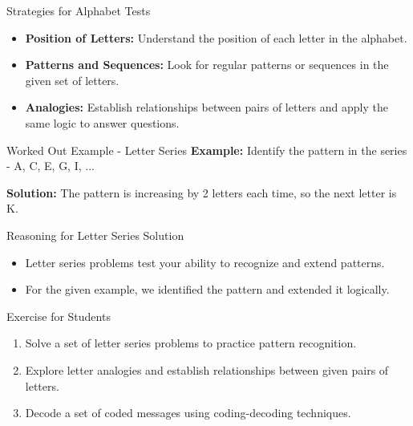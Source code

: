 \begin{frame}{Strategies for Alphabet Tests}
  \begin{itemize}
    \item \textbf{Position of Letters:} Understand the position of each letter in the alphabet.
    \item \textbf{Patterns and Sequences:} Look for regular patterns or sequences in the given set of letters.
    \item \textbf{Analogies:} Establish relationships between pairs of letters and apply the same logic to answer questions.
  \end{itemize}
\end{frame}

\begin{frame}{Worked Out Example - Letter Series}
  \textbf{Example:} Identify the pattern in the series - A, C, E, G, I, ...

  \textbf{Solution:} The pattern is increasing by 2 letters each time, so the next letter is K.
\end{frame}

\begin{frame}{Reasoning for Letter Series Solution}
  \begin{itemize}
    \item Letter series problems test your ability to recognize and extend patterns.
    \item For the given example, we identified the pattern and extended it logically.
  \end{itemize}
\end{frame}

\begin{frame}{Exercise for Students}
  \begin{enumerate}
    \item Solve a set of letter series problems to practice pattern recognition.
    \item Explore letter analogies and establish relationships between given pairs of letters.
    \item Decode a set of coded messages using coding-decoding techniques.
  \end{enumerate}
\end{frame}
